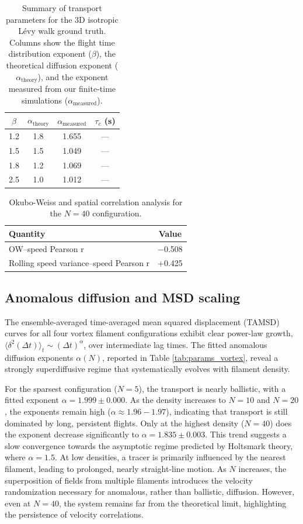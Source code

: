 \documentclass[]{article}
\begin{document}
\begin{table}[h!]
\centering
\caption{Summary of transport parameters for the 3D isotropic L\'evy walk ground truth. Columns show the flight time distribution exponent ($\beta$), the theoretical diffusion exponent ($\alpha_{\text{theory}}$), and the exponent measured from our finite-time simulations ($\alpha_{\text{measured}}$).}
\label{tab:params_levy}
\begin{tabular}{cccc}
\hline
$\beta$ & $\alpha_{\text{theory}}$ & $\alpha_{\text{measured}}$ & $\tau_c$ (s) \\
\hline
1.2 & 1.8 & 1.655 & — \\
1.5 & 1.5 & 1.049 & — \\
1.8 & 1.2 & 1.069 & — \\
2.5 & 1.0 & 1.012 & — \\
\hline
\end{tabular}
\end{table}

\begin{table}[h!]
\centering
\caption{Okubo-Weiss and spatial correlation analysis for the $N=40$ configuration.}
\label{tab:params_ow}
\begin{tabular}{lc}
\hline
Quantity & Value \\
\hline
OW–speed Pearson r & −0.508 \\
Rolling speed variance–speed Pearson r & +0.425 \\
\hline
\end{tabular}
\end{table}

\subsection{Anomalous diffusion and MSD scaling}

The ensemble-averaged time-averaged mean squared displacement (TAMSD) curves for all four vortex filament configurations exhibit clear power-law growth, $\langle \delta^2(\Delta t) \rangle_t \sim (\Delta t)^\alpha$, over intermediate lag times. The fitted anomalous diffusion exponents $\alpha(N)$, reported in Table \ref{tab:params_vortex}, reveal a strongly superdiffusive regime that systematically evolves with filament density.

For the sparsest configuration ($N=5$), the transport is nearly ballistic, with a fitted exponent $\alpha = 1.999 \pm 0.000$. As the density increases to $N=10$ and $N=20$, the exponents remain high ($\alpha \approx 1.96-1.97$), indicating that transport is still dominated by long, persistent flights. Only at the highest density ($N=40$) does the exponent decrease significantly to $\alpha = 1.835 \pm 0.003$. This trend suggests a slow convergence towards the asymptotic regime predicted by Holtsmark theory, where $\alpha = 1.5$. At low densities, a tracer is primarily influenced by the nearest filament, leading to prolonged, nearly straight-line motion. As $N$ increases, the superposition of fields from multiple filaments introduces the velocity randomization necessary for anomalous, rather than ballistic, diffusion. However, even at $N=40$, the system remains far from the theoretical limit, highlighting the persistence of velocity correlations.
\end{document}
